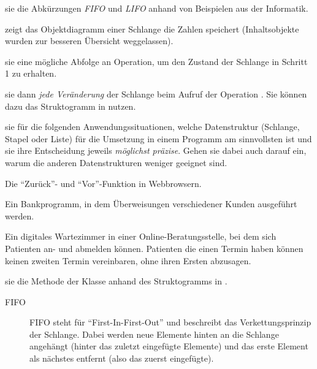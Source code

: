 \begin{aufgabe}[subtitle=Verkettungsprinzipien]
	\begin{teilaufgaben}
		\teilaufgabe
		 sie die Abkürzungen \emph{FIFO} und \emph{LIFO} anhand von Beispielen aus der Informatik.
		
		\teilaufgabe
		 zeigt das Objektdiagramm einer Schlange die Zahlen speichert (Inhaltsobjekte wurden zur besseren Übersicht weggelassen).
		
		 sie eine mögliche Abfolge an Operation, um den Zustand der Schlange in Schritt 1 zu erhalten.
		
		 sie dann \emph{jede Veränderung} der Schlange beim Aufruf der Operation  . Sie können dazu das Struktogramm in  nutzen.
		
		\teilaufgabe
		 sie für die folgenden Anwendungssituationen, welche Datenstruktur (Schlange, Stapel oder Liste) für die Umsetzung in einem Programm am sinnvollsten ist und  sie ihre Entscheidung jeweils \emph{möglichst präzise}. Gehen sie dabei auch darauf ein, warum die anderen Datenstrukturen weniger geeignet sind.
		\begin{smallenumerate}
			\item Die \enquote{Zurück}- und \enquote{Vor}-Funktion in Webbrowsern.
			\item Ein Bankprogramm, in dem Überweisungen verschiedener Kunden ausgeführt werden.
			\item Ein digitales Wartezimmer in einer Online-Beratungsstelle, bei dem sich Patienten an- und abmelden können. Patienten die einen Termin haben können keinen zweiten Termin vereinbaren, ohne ihren Ersten abzusagen.
		\end{smallenumerate}
		
		
		\teilaufgabe
		 sie die Methode  der Klasse  anhand des Struktogramms in .
	\end{teilaufgaben}
	
	\begin{loesung}
		\begin{teilaufgaben}
			\teilaufgabe \begin{description}
				\item[FIFO] FIFO steht für \enquote{First-In-First-Out} und beschreibt das Verkettungsprinzip der Schlange. Dabei werden neue Elemente hinten an die Schlange angehängt (hinter das zuletzt eingefügte Elemente) und das erste Element als nächstes entfernt (also das zuerst eingefügte).
				

\end{description}
\end{teilaufgaben}
\end{loesung}
\end{aufgabe}
